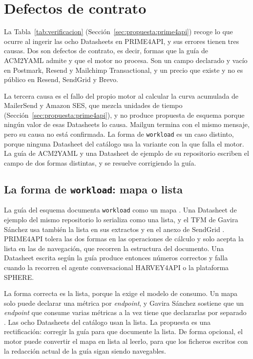 \section{Defectos de contrato}
\label{sec:esquema:contrato}\label{sec:evolucion:contrato}

La Tabla~\ref{tab:verificacion} (Sección~\ref{sec:propuesta:prime4api}) recoge lo que ocurre al ingerir las ocho Datasheets en PRIME4API, y sus errores tienen tres causas.
Dos son defectos de contrato, es decir, formas que la guía de ACM2YAML admite y que el motor no procesa.
Son un campo declarado y vacío en Postmark, Resend y Mailchimp Transactional, y un precio que existe y no es público en Resend, SendGrid y Brevo.

La tercera causa es el fallo del propio motor al calcular la curva acumulada de MailerSend y Amazon SES, que mezcla unidades de tiempo (Sección~\ref{sec:propuesta:prime4api}), y no produce propuesta de esquema porque ningún valor de esas Datasheets lo causa.
Mailgun termina con el mismo mensaje, pero su causa no está confirmada.
La forma de \texttt{workload} es un caso distinto, porque ninguna Datasheet del catálogo usa la variante con la que falla el motor.
La guía de ACM2YAML y una Datasheet de ejemplo de su repositorio escriben el campo de dos formas distintas, y se resuelve corrigiendo la guía.

\subsection{La forma de \texttt{workload}: mapa o lista}
\label{subsec:evolucion:dv01}

La guía del esquema documenta \texttt{workload} como un mapa \citep{apisconsumptionmodel}.
Una Datasheet de ejemplo del mismo repositorio lo serializa como una lista, y el TFM de Gavira Sánchez usa también la lista en sus extractos y en el anexo de SendGrid \citep{gavira2026tfm}.
PRIME4API tolera las dos formas en las operaciones de cálculo y solo acepta la lista en las de navegación, que recorren la estructura del documento.
Una Datasheet escrita según la guía produce entonces números correctos y falla cuando la recorren el agente conversacional HARVEY4API o la plataforma SPHERE.

La forma correcta es la lista, porque la exige el modelo de consumo.
Un mapa solo puede declarar una métrica por \textit{endpoint}, y Gavira Sánchez sostiene que un \textit{endpoint} que consume varias métricas a la vez tiene que declararlas por separado \citep{gavira2026tfm}.
Las ocho Datasheets del catálogo usan la lista.
La propuesta es una rectificación: corregir la guía para que documente la lista.
De forma opcional, el motor puede convertir el mapa en lista al leerlo, para que los ficheros escritos con la redacción actual de la guía sigan siendo navegables.

